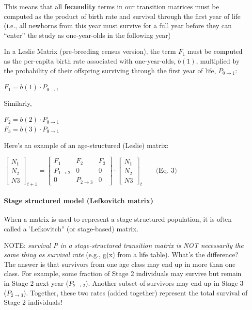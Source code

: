 \documentclass[
]{article}
\begin{document}
This means that all \textbf{fecundity} terms in our transition matrices
must be computed as the product of birth rate and survival through the
first year of life (i.e., all newborns from this year must survive for a
full year before they can ``enter'' the study as one-year-olds in the
following year)

In a Leslie Matrix (pre-breeding census version), the term \(F_1\) must
be computed as the per-capita birth rate associated with one-year-olds,
\(b(1)\), multiplied by the probability of their offspring surviving
through the first year of life, \(P_{0 \rightarrow 1}\):

\(F_1=b(1) \cdot P_{0 \rightarrow 1}\)

Similarly,

\(F_2=b(2) \cdot P_{0 \rightarrow 1}\)\\
\(F_3=b(3) \cdot P_{0 \rightarrow 1}\)

Here's an example of an age-structured (Leslie) matrix:

\(\begin{bmatrix}N_1\\N_2\\ N3 \end{bmatrix}_{t+1}=\begin{bmatrix}F_1 & F_2 & F_3\\ P_{1 \rightarrow 2} & 0 & 0\\ 0 & P_{2 \rightarrow 3} & 0\end{bmatrix} \cdot \begin{bmatrix}N_1\\N_2\\N3 \end{bmatrix}_{t} \qquad \text{(Eq. 3)}\)

\hypertarget{stage-structured-model-lefkovitch-matrix}{%
\paragraph{Stage structured model (Lefkovitch
matrix)}\label{stage-structured-model-lefkovitch-matrix}}

When a matrix is used to represent a stage-structured population, it is
often called a 'Lefkovitch'' (or stage-based) matrix.

NOTE: \emph{survival \emph{P} in a stage-structured transition matrix is
NOT necessarily the same thing as survival rate} (e.g., g(x) from a life
table). What's the difference? The answer is that survivors from one age
class may end up in more than one class. For example, some fraction of
Stage 2 individuals may survive but remain in Stage 2 next year
(\(P_{2 \rightarrow 2}\)). Another subset of survivors may end up in
Stage 3 (\(P_{2 \rightarrow 3}\)). Together, these two rates (added
together) represent the total survival of Stage 2 individuals!
\end{document}
